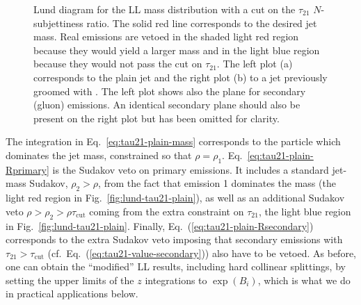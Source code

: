\begin{figure}[t]
  \centering
  \hfill%
  \caption{Lund diagram for the LL mass distribution with a cut on the
    $\tau_{21}$ $N$-subjettiness ratio. The solid red line corresponds
    to the desired jet mass. Real emissions are vetoed in the shaded
    light red region because they would yield a larger mass and in the
    light blue region because they would not pass the cut on
    $\tau_{21}$. The left plot (a) corresponds to the plain jet and the
    right plot (b) to a jet previously groomed with \SD. The left
    plot shows also the plane for secondary (gluon) emissions. An
    identical secondary plane should also be present on the right plot
    but has been omitted for clarity.}\label{fig:lund-tau21}
\end{figure}  

The integration in Eq.~\eqref{eq:tau21-plain-mass} corresponds to the
particle which dominates the jet mass, \ie constrained so that
$\rho=\rho_1$. Eq.~\eqref{eq:tau21-plain-Rprimary} is the Sudakov veto
on primary emissions. It includes a standard jet-mass Sudakov,
$\rho_2>\rho$, from the fact that emission 1 dominates the mass (the
light red region in Fig.~\ref{fig:lund-tau21-plain}), as well as an
additional Sudakov veto $\rho>\rho_2>\rho\tau_\text{cut}$ coming from
the extra constraint on $\tau_{21}$, the light blue region in
Fig.~\ref{fig:lund-tau21-plain}.
%
Finally, Eq.~(\ref{eq:tau21-plain-Rsecondary}) corresponds to the extra
Sudakov veto imposing that secondary emissions with
$\tau_{21}>\tau_\text{cut}$ (cf.~Eq.~(\ref{eq:tau21-value-secondary}))
also have to be vetoed.
%
As before, one can obtain the ``modified'' LL results, including hard
collinear splittings, by setting the upper limits of the $z$ integrations
to $\exp(B_i)$, which is what we do in practical applications below.


